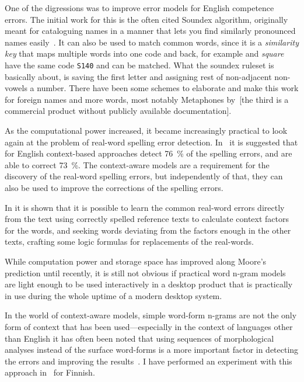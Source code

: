 \documentclass[officiallayout]{unihelcompling}
\newcommand\misspelt{\bgroup\markoverwith
{\textcolor{red}{\lower3.5pt\hbox{\sixly \char58}}}\ULon}
\begin{document}
One of the digressions was to improve error models for English competence
errors. The initial work for this is the often cited Soundex algorithm,
originally meant for cataloguing names in a manner that lets you find similarly
pronounced names easily~\citep{russell1918soundex}. It can also be used to
match common words, since it is a \emph{similarity key} that maps multiple
words into one code and back, for example \misspelt{squer} and \emph{square}
have the same code \texttt{S140} and can be matched. What the soundex ruleset
is basically about, is saving the first letter and assigning rest of
non-adjacent non-vowels a number. There have been some schemes to elaborate and
make this work for foreign names and more words, most notably Metaphones
by~\citet{philips1990hanging,philips2000double}[the third is a commercial
product without publicly available documentation].

As the computational power increased, it became increasingly practical to look
again at the problem of real-word spelling error detection.
In~\citet{mays1991context} it is suggested that for English context-based
approaches detect 76~\% of the spelling errors, and are able to correct 73~\%.
The context-aware models are a requirement for the discovery of the real-word
spelling errors, but independently of that, they can also be used to improve
the corrections of the spelling errors. 

In \citet{al2006learning} it is shown that it is possible to learn the common
real-word errors directly from the text using correctly spelled reference texts
to calculate context factors for the words, and seeking words deviating from
the factors enough in the other texts, crafting some logic formulas for
replacements of the real-words.

While computation power and storage space has improved along Moore's
prediction until recently, it is still not obvious if practical word n-gram
models are light enough to be used interactively in a desktop product that is
practically in use during the whole uptime of a modern desktop system.

In the world of context-aware models, simple word-form n-grams are not the only
form of context that has been used---especially in the context of languages
other than English it has often been noted that using sequences of
morphological analyses instead of the surface word-forms is a more important
factor in detecting the errors and improving the results~\citep[for
Spanish]{otero2007contextual}. I have performed an experiment with this
approach in~ for Finnish.
\end{document}
